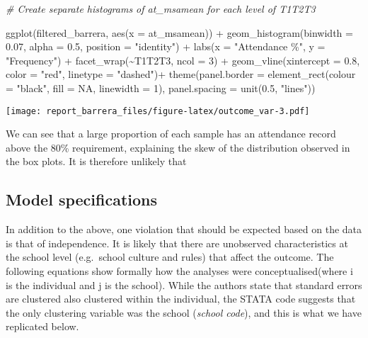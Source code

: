 \documentclass[
]{article}
\newenvironment{Shaded}{\begin{snugshade}}{\end{snugshade}}
\newcommand{\AttributeTok}[1]{\textcolor[rgb]{0.77,0.63,0.00}{#1}}
\newcommand{\CommentTok}[1]{\textcolor[rgb]{0.56,0.35,0.01}{\textit{#1}}}
\newcommand{\ConstantTok}[1]{\textcolor[rgb]{0.00,0.00,0.00}{#1}}
\newcommand{\DecValTok}[1]{\textcolor[rgb]{0.00,0.00,0.81}{#1}}
\newcommand{\FloatTok}[1]{\textcolor[rgb]{0.00,0.00,0.81}{#1}}
\newcommand{\FunctionTok}[1]{\textcolor[rgb]{0.00,0.00,0.00}{#1}}
\newcommand{\NormalTok}[1]{#1}
\newcommand{\SpecialCharTok}[1]{\textcolor[rgb]{0.00,0.00,0.00}{#1}}
\newcommand{\StringTok}[1]{\textcolor[rgb]{0.31,0.60,0.02}{#1}}
\begin{document}
\begin{Shaded}
\begin{Highlighting}[]
\CommentTok{\# Create separate histograms of at\_msamean for each level of T1T2T3}

\FunctionTok{ggplot}\NormalTok{(filtered\_barrera, }\FunctionTok{aes}\NormalTok{(}\AttributeTok{x =}\NormalTok{ at\_msamean)) }\SpecialCharTok{+}
  \FunctionTok{geom\_histogram}\NormalTok{(}\AttributeTok{binwidth =} \FloatTok{0.07}\NormalTok{, }\AttributeTok{alpha =} \FloatTok{0.5}\NormalTok{, }\AttributeTok{position =} \StringTok{"identity"}\NormalTok{) }\SpecialCharTok{+}
  \FunctionTok{labs}\NormalTok{(}\AttributeTok{x =} \StringTok{"Attendance \%"}\NormalTok{, }\AttributeTok{y =} \StringTok{"Frequency"}\NormalTok{) }\SpecialCharTok{+}
  \FunctionTok{facet\_wrap}\NormalTok{(}\SpecialCharTok{\textasciitilde{}}\NormalTok{T1T2T3, }\AttributeTok{ncol =} \DecValTok{3}\NormalTok{) }\SpecialCharTok{+}
  \FunctionTok{geom\_vline}\NormalTok{(}\AttributeTok{xintercept =} \FloatTok{0.8}\NormalTok{, }\AttributeTok{color =} \StringTok{"red"}\NormalTok{, }\AttributeTok{linetype =} \StringTok{"dashed"}\NormalTok{)}\SpecialCharTok{+}
  \FunctionTok{theme}\NormalTok{(}\AttributeTok{panel.border =} \FunctionTok{element\_rect}\NormalTok{(}\AttributeTok{colour =} \StringTok{"black"}\NormalTok{, }\AttributeTok{fill =} \ConstantTok{NA}\NormalTok{, }\AttributeTok{linewidth =} \DecValTok{1}\NormalTok{),}
        \AttributeTok{panel.spacing =} \FunctionTok{unit}\NormalTok{(}\FloatTok{0.5}\NormalTok{, }\StringTok{"lines"}\NormalTok{))}
\end{Highlighting}
\end{Shaded}

\texttt{[image: report\_barrera\_files/figure-latex/outcome\_var-3.pdf]}

We can see that a large proportion of each sample has an attendance
record above the 80\% requirement, explaining the skew of the
distribution observed in the box plots. It is therefore unlikely that

\hypertarget{model-specifications}{%
\subsection{Model specifications}\label{model-specifications}}

In addition to the above, one violation that should be expected based on
the data is that of independence. It is likely that there are unobserved
characteristics at the school level (e.g.~school culture and rules) that
affect the outcome. The following equations show formally how the
analyses were conceptualised(where i is the individual and j is the
school). While the authors state that standard errors are clustered also
clustered within the individual, the STATA code suggests that the only
clustering variable was the school (\emph{school code}), and this is
what we have replicated below.
\end{document}
